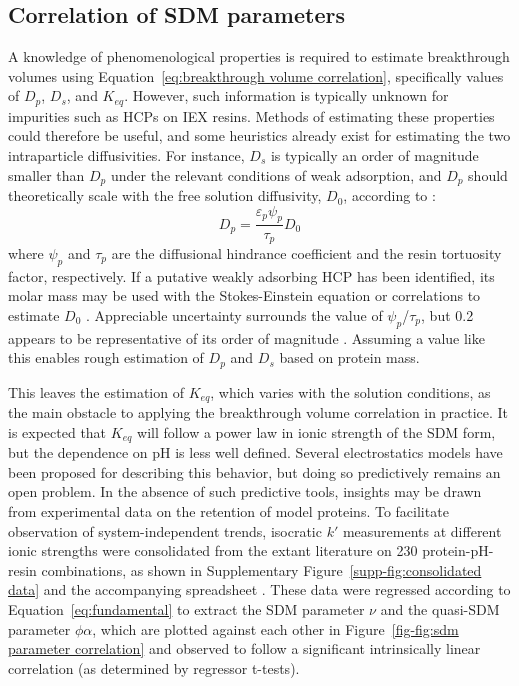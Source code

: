 \documentclass[preprint,review,12pt]{elsarticle}
\providecommand{\DIFaddtex}[1]{{\protect\color{blue} \sf #1}} %
\providecommand{\DIFaddbegin}{} %
\providecommand{\DIFaddend}{} %
\providecommand{\DIFadd}[1]{\texorpdfstring{\DIFaddtex{#1}}{#1}} %
\begin{document}
    \subsection{Correlation of SDM parameters} \label{ssec:thermo corr}

        A knowledge of phenomenological properties is required to estimate breakthrough volumes using Equation~\ref{eq:breakthrough volume correlation}, specifically values of $D_p$, $D_s$, and $K_{eq}$. However, such information is typically unknown for impurities such as HCPs on IEX resins. Methods of estimating these properties could therefore be useful, and some heuristics already exist for estimating the two intraparticle diffusivities. For instance, $D_s$ is typically an order of magnitude smaller than $D_p$ under the relevant conditions of weak adsorption, and $D_p$ should theoretically scale with the free solution diffusivity, $D_0$, according to \cite{Carta2010a}:
        \begin{equation} \label{eq:tortuosity relationship}
            D_p = \frac{\varepsilon_p \psi_p}{\tau_p} D_0
        \end{equation}
        where $\psi_p$ and $\tau_p$ are the diffusional hindrance coefficient and the resin tortuosity factor, respectively. If a putative weakly adsorbing HCP has been identified, its molar mass may be used with the Stokes-Einstein equation or correlations to estimate $D_0$ \cite{Young1980}. Appreciable uncertainty surrounds the value of $\psi_p$/$\tau_p$, but 0.2 appears to be representative of its order of magnitude \cite{Angelo2016b}. Assuming a value like this enables rough estimation of $D_p$ and $D_s$ based on protein mass.



        This leaves the estimation of $K_{eq}$, which varies with the solution conditions, as the main obstacle to applying the breakthrough volume correlation in practice. It is expected that $K_{eq}$ will follow a power law in ionic strength of the SDM form, but the dependence on pH is less well defined. Several electrostatics models have been proposed for describing this behavior, but doing so predictively remains an open problem. In the absence of such predictive tools, insights may be drawn from experimental data on the retention of model proteins. To facilitate observation of system-independent trends, isocratic $k'$ measurements at different ionic strengths were consolidated from the extant literature on 230 protein-pH-resin combinations, as shown in Supplementary Figure~\ref{supp-fig:consolidated data} \DIFaddbegin \DIFadd{and the accompanying spreadsheet }\DIFaddend \cite{Staby2000, Staby2001, Staby2004, Staby2005, Staby2006, Staby2007, DePhillips2001, DePhillips2004, Kumar2015, bai1999}. These data were regressed according to Equation~\ref{eq:fundamental} to extract the SDM parameter $\nu$ and the quasi-SDM parameter $\phi \alpha$, which are plotted against each other in Figure~\ref{fig-fig:sdm parameter correlation} and observed to follow a significant intrinsically linear correlation (as determined by regressor t-tests).
\end{document}
